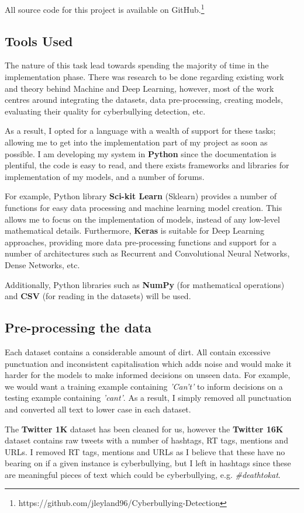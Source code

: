 \documentclass[12pt,a4paper]{article}
\begin{document}
All source code for this project is available on GitHub.\footnote{https://github.com/jleyland96/Cyberbullying-Detection}

\subsection{Tools Used}
The nature of this task lead towards spending the majority of time in the implementation phase. There was research to be done regarding existing work and theory behind Machine and Deep Learning, however, most of the work centres around integrating the datasets, data pre-processing, creating models, evaluating their quality for cyberbullying detection, etc. 

As a result, I opted for a language with a wealth of support for these tasks; allowing me to get into the implementation part of my project as soon as possible. I am developing my system in \textbf{Python} since the documentation is plentiful, the code is easy to read, and there exists frameworks and libraries for implementation of my models, and a number of forums. 

For example, Python library \textbf{Sci-kit Learn} (Sklearn) provides a number of functions for easy data processing and machine learning model creation. This allows me to focus on the implementation of models, instead of any low-level mathematical details. Furthermore, \textbf{Keras} is suitable for Deep Learning approaches, providing more data pre-processing functions and support for a number of architectures such as Recurrent and Convolutional Neural Networks, Dense Networks, etc. 

Additionally, Python libraries such as \textbf{NumPy} (for mathematical operations) and \textbf{CSV} (for reading in the datasets) will be used.

\subsection{Pre-processing the data}
Each dataset contains a considerable amount of dirt. All contain excessive punctuation and inconsistent capitalisation which adds noise and would make it harder for the models to make informed decisions on unseen data. For example, we would want a training example containing \textit{'Can't'} to inform decisions on a testing example containing \textit{'cant'}. As a result, I simply removed all punctuation and converted all text to lower case in each dataset. 

The \textbf{Twitter 1K} dataset has been cleaned for us, however the \textbf{Twitter 16K} dataset contains raw tweets with a number of hashtags, RT tags, mentions and URLs. I removed RT tags, mentions and URLs as I believe that these have no bearing on if a given instance is cyberbullying, but I left in hashtags since these are meaningful pieces of text which could be cyberbullying, e.g. \textit{\#deathtokat}.
\end{document}
